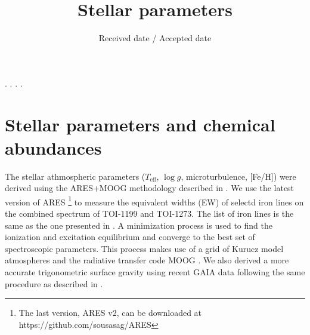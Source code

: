 \documentclass[]{aa} %
\begin{document}
  \title{Stellar parameters}

  \author{         }

  \institute{}


  \date{Received date / Accepted date }
 
  \abstract
  {}
  {.}
  {.}
  {.}
  {.}
  
  \keywords{}


  
\maketitle

%



\section{Stellar parameters and chemical abundances}            \label{sec:parameters}

The stellar athmospheric parameters ($T_{\mathrm{eff}}$, $\log g$, microturbulence, [Fe/H]) were derived using the ARES+MOOG methodology described in \citet[][]{Sousa-21, Sousa-14, Santos-13}. We use the latest version of ARES \footnote{The last version, ARES v2, can be downloaded at https://github.com/sousasag/ARES} \citep{Sousa-07, Sousa-15} to measure the equivalent widths (EW) of selectd iron lines on the combined spectrum of TOI-1199 and TOI-1273. The list of iron lines is the same as the one presented in \citet[][]{Sousa-08}. A minimization process is used to find the ionization and excitation equilibrium and converge to the best set of spectroscopic parameters. This process makes use of a grid of Kurucz model atmospheres \citep{Kurucz-93} and the radiative transfer code MOOG \citep{Sneden-73}. We also derived a more accurate trigonometric surface gravity using recent GAIA data following the same procedure as described in \citet[][]{Sousa-21}.



\end{document}
